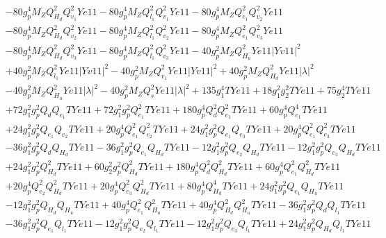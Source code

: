 \begin{align}
 &-80 g_{p}^{4} M_Z Q_{H_d}^{2} Q_{v_1}^{2} Ye11 -80 g_{p}^{4} M_Z Q_{l_1}^{2} Q_{v_1}^{2} Ye11 -80 g_{p}^{4} M_Z Q_{e_{1}}^{2} Q_{v_2}^{2} Ye11 \nonumber \\ 
 &-80 g_{p}^{4} M_Z Q_{H_d}^{2} Q_{v_2}^{2} Ye11 -80 g_{p}^{4} M_Z Q_{l_1}^{2} Q_{v_2}^{2} Ye11 -80 g_{p}^{4} M_Z Q_{e_{1}}^{2} Q_{v_3}^{2} Ye11 \nonumber \\ 
 &-80 g_{p}^{4} M_Z Q_{H_d}^{2} Q_{v_3}^{2} Ye11 -80 g_{p}^{4} M_Z Q_{l_1}^{2} Q_{v_3}^{2} Ye11 -40 g_{p}^{2} M_Z Q_{H_u}^{2} Ye11 |Yv11|^2 \nonumber \\ 
 &+40 g_{p}^{2} M_Z Q_{l_1}^{2} Ye11 |Yv11|^2 -40 g_{p}^{2} M_Z Q_{v_1}^{2} Ye11 |Yv11|^2 +40 g_{p}^{2} M_Z Q_{H_d}^{2} Ye11 |\lambda|^2 \nonumber \\ 
 &-40 g_{p}^{2} M_Z Q_{H_u}^{2} Ye11 |\lambda|^2 -40 g_{p}^{2} M_Z Q_{s}^{2} Ye11 |\lambda|^2 +135 g_{1}^{4} TYe11 +18 g_{1}^{2} g_{2}^{2} TYe11 +75 g_{2}^{4} TYe11 \nonumber \\ 
 &+72 g_{1}^{2} g_{p}^{2} Q_{d} Q_{e_{1}} TYe11 +72 g_{1}^{2} g_{p}^{2} Q_{e_{1}}^{2} TYe11 +180 g_{p}^{4} Q_{d}^{2} Q_{e_{1}}^{2} TYe11 +60 g_{p}^{4} Q_{e_{1}}^{4} TYe11 \nonumber \\ 
 &+24 g_{1}^{2} g_{p}^{2} Q_{e_{1}} Q_{e_{2}} TYe11 +20 g_{p}^{4} Q_{e_{1}}^{2} Q_{e_{2}}^{2} TYe11 +24 g_{1}^{2} g_{p}^{2} Q_{e_{1}} Q_{e_3} TYe11 +20 g_{p}^{4} Q_{e_{1}}^{2} Q_{e_3}^{2} TYe11 \nonumber \\ 
 &-36 g_{1}^{2} g_{p}^{2} Q_{d} Q_{H_d} TYe11 -36 g_{1}^{2} g_{p}^{2} Q_{e_{1}} Q_{H_d} TYe11 -12 g_{1}^{2} g_{p}^{2} Q_{e_{2}} Q_{H_d} TYe11 -12 g_{1}^{2} g_{p}^{2} Q_{e_3} Q_{H_d} TYe11 \nonumber \\ 
 &+24 g_{1}^{2} g_{p}^{2} Q_{H_d}^{2} TYe11 +60 g_{2}^{2} g_{p}^{2} Q_{H_d}^{2} TYe11 +180 g_{p}^{4} Q_{d}^{2} Q_{H_d}^{2} TYe11 +60 g_{p}^{4} Q_{e_{1}}^{2} Q_{H_d}^{2} TYe11 \nonumber \\ 
 &+20 g_{p}^{4} Q_{e_{2}}^{2} Q_{H_d}^{2} TYe11 +20 g_{p}^{4} Q_{e_3}^{2} Q_{H_d}^{2} TYe11 +80 g_{p}^{4} Q_{H_d}^{4} TYe11 +24 g_{1}^{2} g_{p}^{2} Q_{e_{1}} Q_{H_u} TYe11 \nonumber \\ 
 &-12 g_{1}^{2} g_{p}^{2} Q_{H_d} Q_{H_u} TYe11 +40 g_{p}^{4} Q_{e_{1}}^{2} Q_{H_u}^{2} TYe11 +40 g_{p}^{4} Q_{H_d}^{2} Q_{H_u}^{2} TYe11 -36 g_{1}^{2} g_{p}^{2} Q_{d} Q_{l_1} TYe11 \nonumber \\ 
 &-36 g_{1}^{2} g_{p}^{2} Q_{e_{1}} Q_{l_1} TYe11 -12 g_{1}^{2} g_{p}^{2} Q_{e_{2}} Q_{l_1} TYe11 -12 g_{1}^{2} g_{p}^{2} Q_{e_3} Q_{l_1} TYe11 +24 g_{1}^{2} g_{p}^{2} Q_{H_d} Q_{l_1} TYe11 \nonumber \\ 

\end{align}
